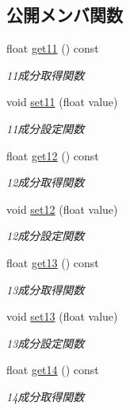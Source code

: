 \subsection*{公開メンバ関数}
\begin{DoxyCompactItemize}
\item 
float \mbox{\hyperlink{class_matrix_aae88110e606dea36cd7d01057edbe567}{get11}} () const
\begin{DoxyCompactList}\small\item\em 11成分取得関数 \end{DoxyCompactList}\item 
void \mbox{\hyperlink{class_matrix_a702141355d7a4161432299224844b193}{set11}} (float value)
\begin{DoxyCompactList}\small\item\em 11成分設定関数 \end{DoxyCompactList}\item 
float \mbox{\hyperlink{class_matrix_abcea3af9d2b4a775a4850e7e061149a6}{get12}} () const
\begin{DoxyCompactList}\small\item\em 12成分取得関数 \end{DoxyCompactList}\item 
void \mbox{\hyperlink{class_matrix_a16351455b43031ca0aaf27dceb3b65b4}{set12}} (float value)
\begin{DoxyCompactList}\small\item\em 12成分設定関数 \end{DoxyCompactList}\item 
float \mbox{\hyperlink{class_matrix_a921bc8b3e2f3e373fe2728075caf462f}{get13}} () const
\begin{DoxyCompactList}\small\item\em 13成分取得関数 \end{DoxyCompactList}\item 
void \mbox{\hyperlink{class_matrix_a0aa865228e8713575ccba777c0a1a059}{set13}} (float value)
\begin{DoxyCompactList}\small\item\em 13成分設定関数 \end{DoxyCompactList}\item 
float \mbox{\hyperlink{class_matrix_a2e5886125fced6427695c51f99bfbd98}{get14}} () const
\begin{DoxyCompactList}\small\item\em 14成分取得関数 \end{DoxyCompactList}\item 

\end{DoxyCompactItemize}
